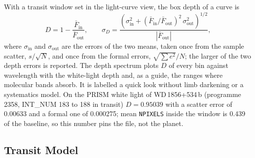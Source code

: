 \documentclass[11pt,a4paper]{article}
\newcommand{\code}[1]{\texttt{\small #1}}
\begin{document}
    With a transit window set in the light-curve view, the box depth of a curve is
    \begin{equation}
        D = 1 - \frac{\bar{F}_{\text{in}}}{\bar{F}_{\text{out}}}, \qquad
        \sigma_D = \frac{\left(\sigma_{\text{in}}^2 + (\bar{F}_{\text{in}}/\bar{F}_{\text{out}})^2\,\sigma_{\text{out}}^2\right)^{1/2}}{|\bar{F}_{\text{out}}|},
    \end{equation}
    where $\sigma_{\text{in}}$ and $\sigma_{\text{out}}$ are the errors of the two means, taken once from the sample scatter, $s/\sqrt{N}$, and once from the formal errors, $\sqrt{\sum e^2}/N$; the larger of the two depth errors is reported. The depth spectrum plots $D$ of every bin against wavelength with the white-light depth and, as a guide, the ranges where molecular bands absorb. It is labelled a quick look without limb darkening or a systematics model. On the PRISM white light of WD\,1856+534\,b (programme 2358, INT\_NUM 183 to 188 in transit) $D = 0.95039$ with a scatter error of 0.00633 and a formal one of 0.000275; mean \code{NPIXELS} inside the window is 0.439 of the baseline, so this number pins the file, not the planet.

    \subsection{Transit Model}
    \label{sec:transit_model}
\end{document}
